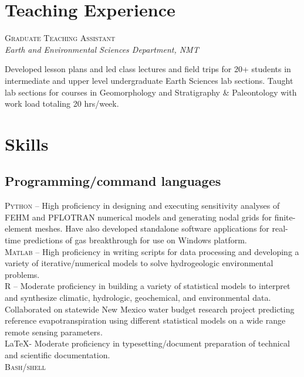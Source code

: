 \documentclass[11pt, letterpaper]{article}
\newcommand{\years}[1]{\marginnote{\scriptsize #1}}
\begin{document}
\section*{Teaching Experience}
\noindent
\years{2015 - 2016}\textsc{Graduate Teaching Assistant}\\
\textit{Earth and Environmental Sciences Department, NMT}
\begin{adjustwidth}{5pt}{0pt}
	Developed lesson plans and led class lectures and field trips for 20+ students in intermediate and upper level undergraduate Earth Sciences lab sections. Taught lab sections for courses in Geomorphology and Stratigraphy \& Paleontology with work load totaling 20 hrs/week.  
\end{adjustwidth}

\section*{Skills}
\subsection*{Programming/command languages}
\noindent
\textsc{Python} – High proficiency in designing and executing sensitivity analyses of FEHM and PFLOTRAN numerical models and generating nodal grids for finite-element meshes. Have also developed standalone software applications for real-time predictions of gas breakthrough for use on Windows platform.\\[5pt]
\textsc{Matlab} – High proficiency in writing scripts for data processing and developing a variety of iterative/numerical models to solve hydrogeologic environmental problems.\\[5pt]
\textsc{R} – Moderate proficiency in building a variety of statistical models to interpret and synthesize climatic, hydrologic, geochemical, and environmental data. Collaborated on statewide New Mexico water budget research project predicting reference evapotranspiration using different statistical models on a wide range remote sensing parameters.\\[5pt]
\LaTeX - Moderate proficiency in typesetting/document preparation of technical and scientific documentation. \\[5pt]
\textsc{Bash/shell}
\end{document}
